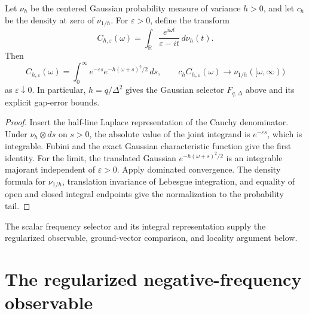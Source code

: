 \begin{lemma}
    \label{lem:hk_gaussian_cauchy_limit}
    \leanok
    Let $\nu_h$ be the centered Gaussian probability measure of variance
    $h>0$, and let $c_h$ be the density at zero of $\nu_{1/h}$.
    For $\varepsilon>0$, define the transform
    \[
        C_{h,\varepsilon}(\omega)=\int_{\mathbb R}
        \frac{e^{i\omega t}}{\varepsilon-it}\,d\nu_h(t).
    \]
    Then
    \[
        C_{h,\varepsilon}(\omega)=
        \int_0^\infty e^{-\varepsilon s}
        e^{-h(\omega+s)^2/2}\,ds,
        \qquad
        c_hC_{h,\varepsilon}(\omega)
        \longrightarrow \nu_{1/h}([\omega,\infty))
    \]
    as $\varepsilon\downarrow0$.
    In particular, $h=q/\Delta^2$ gives the Gaussian selector
    $F_{q,\Delta}$ above and its explicit gap-error bounds.
\end{lemma}
\begin{proof}\leanok
    Insert the half-line Laplace representation of the Cauchy
    denominator. Under $\nu_h\otimes ds$ on $s>0$, the absolute value of
    the joint integrand is $e^{-\varepsilon s}$, which is integrable.
    Fubini and the exact Gaussian characteristic function give the first
    identity. For the limit, the translated Gaussian
    $e^{-h(\omega+s)^2/2}$ is an integrable majorant independent of
    $\varepsilon>0$. Apply dominated convergence.
    The density formula for $\nu_{1/h}$, translation invariance
    of Lebesgue integration, and equality of open and closed integral
    endpoints give the normalization to the probability tail.
\end{proof}

The scalar frequency selector and its integral representation supply
the regularized observable, ground-vector comparison, and locality
argument below.

\section{The regularized negative-frequency observable}
\label{sec:hk_regularized_observable}

